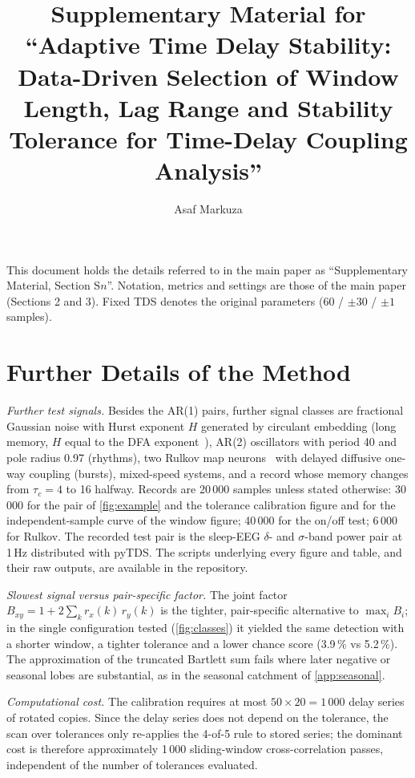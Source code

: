 \documentclass[11pt,a4paper]{article}
\title{Supplementary Material for\\ ``Adaptive Time Delay Stability: Data-Driven Selection of Window Length, Lag Range and Stability Tolerance for Time-Delay Coupling Analysis''}
\author{Asaf Markuza}
\date{}
\begin{document}
\maketitle

\noindent This document holds the details referred to in the main paper as ``Supplementary Material, Section S$n$''. Notation, metrics and settings are those of the main paper (Sections 2 and 3). Fixed TDS denotes the original parameters (60 / $\pm30$ / $\pm1$ samples).

\section{Further Details of the Method}
\label{app:method}

\emph{Further test signals.} Besides the AR(1) pairs, further signal classes are fractional Gaussian noise with Hurst exponent $H$ generated by circulant embedding (long memory, $H$ equal to the DFA exponent~\cite{Peng1995QuantificationScaling}), AR(2) oscillators with period 40 and pole radius 0.97 (rhythms), two Rulkov map neurons~\cite{Rulkov2002ModelingSpikingbursting} with delayed diffusive one-way coupling (bursts), mixed-speed systems, and a record whose memory changes from $\tau_c = 4$ to 16 halfway. Records are 20\,000 samples unless stated otherwise: 30\,000 for the pair of \cref{fig:example} and the tolerance calibration figure and for the independent-sample curve of the window figure; 40\,000 for the on/off test; 6\,000 for Rulkov. The recorded test pair is the sleep-EEG $\delta$- and $\sigma$-band power pair at 1\,Hz distributed with pyTDS. The scripts underlying every figure and table, and their raw outputs, are available in the repository.

\emph{Slowest signal versus pair-specific factor.} The joint factor $B_{xy} = 1 + 2\sum_k r_x(k)\,r_y(k)$ is the tighter, pair-specific alternative to $\max_i B_i$; in the single configuration tested (\cref{fig:classes}) it yielded the same detection with a shorter window, a tighter tolerance and a lower chance score (3.9\,\% vs 5.2\,\%). The approximation of the truncated Bartlett sum fails where later negative or seasonal lobes are substantial, as in the seasonal catchment of \cref{app:seasonal}.

\emph{Computational cost.} The calibration requires at most $50 \times 20 = 1\,000$ delay series of rotated copies. Since the delay series does not depend on the tolerance, the scan over tolerances only re-applies the 4-of-5 rule to stored series; the dominant cost is therefore approximately 1\,000 sliding-window cross-correlation passes, independent of the number of tolerances evaluated.
\end{document}
